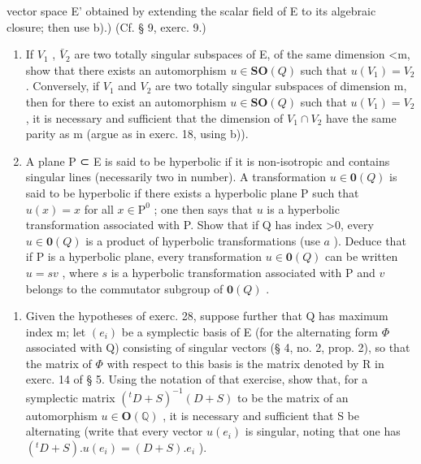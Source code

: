 vector space E' obtained by extending the scalar field of E to its algebraic closure; then use b).) (Cf. § 9, exerc. 9.)

\begin{enumerate}
\def\labelenumi{\alph{enumi})}
\setcounter{enumi}{3}
\item
  If \(V_{1}\) , \(\bar{V}_{2}\) are two totally singular subspaces of E, of the same dimension \textless m, show that there exists an automorphism \(u \in \mathbf{SO}(Q)\) such that \(u(V_{1}) = V_{2}\) . Conversely, if \(V_{1}\) and \(V_{2}\) are two totally singular subspaces of dimension m, then for there to exist an automorphism \(u \in \mathbf{SO}(Q)\) such that \(u(V_{1}) = V_{2}\) , it is necessary and sufficient that the dimension of \(V_{1} \cap V_{2}\) have the same parity as m (argue as in exerc. 18, using b)).
\item
  A plane P ⊂ E is said to be hyperbolic if it is non-isotropic and contains singular lines (necessarily two in number). A transformation \(u \in \mathbf{0}(Q)\) is said to be hyperbolic if there exists a hyperbolic plane P such that \(u(x) = x\) for all \(x \in \mathrm{P}^0\) ; one then says that \(u\) is a hyperbolic transformation associated with P. Show that if Q has index \textgreater0, every \(u \in \mathbf{0}(Q)\) is a product of hyperbolic transformations (use \(a\) ). Deduce that if P is a hyperbolic plane, every transformation \(u \in \mathbf{0}(Q)\) can be written \(u = sv\) , where \(s\) is a hyperbolic transformation associated with P and \(v\) belongs to the commutator subgroup of \(\mathbf{0}(Q)\) .
\end{enumerate}

\begin{enumerate}
\def\labelenumi{\arabic{enumi})}
\setcounter{enumi}{28}
\tightlist
\item
  Given the hypotheses of exerc. 28, suppose further that Q has maximum index m; let \((e_{i})\) be a symplectic basis of E (for the alternating form \(\Phi\) associated with Q) consisting of singular vectors (§ 4, no. 2, prop. 2), so that the matrix of \(\Phi\) with respect to this basis is the matrix denoted by R in exerc. 14 of § 5. Using the notation of that exercise, show that, for a symplectic matrix \((^{t}D + S)^{-1}(D + S)\) to be the matrix of an automorphism \(u \in \mathbf{O}(\mathbb{Q})\) , it is necessary and sufficient that S be alternating (write that every vector \(u(e_{i})\) is singular, noting that one has \((^{t}D + S).u(e_{i}) = (D + S).e_{i}\) ).
\end{enumerate}

